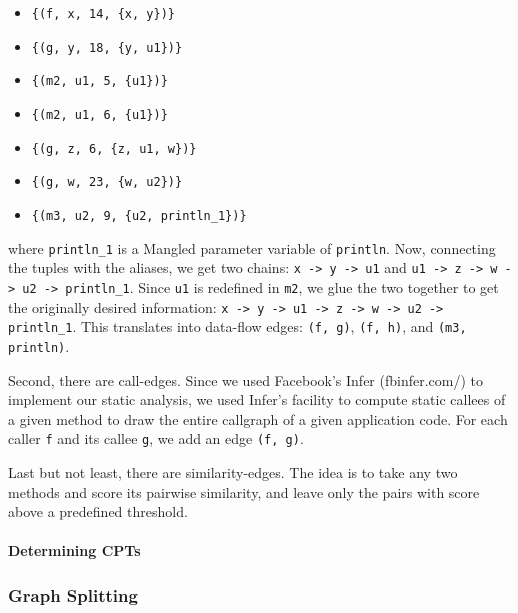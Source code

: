\documentclass[sigconf,review,anonymous]{acmart}\settopmatter{printfolios=true,printccs=false,printacmref=false}
\begin{document}
\begin{itemize}

\item \texttt{\{(f, x, 14, \{x, y\})\}}
\item \texttt{\{(g, y, 18, \{y, u1\})\}}
\item \texttt{\{(m2, u1, 5, \{u1\})\}}
\item \texttt{\{(m2, u1, 6, \{u1\})\}}
\item \texttt{\{(g, z, 6, \{z, u1, w\})\}}
\item \texttt{\{(g, w, 23, \{w, u2\})\}}
\item \texttt{\{(m3, u2, 9, \{u2, println_1\})\}}
    
\end{itemize}

where \texttt{println_1} is a Mangled parameter variable of \texttt{println}.
Now, connecting the tuples with the aliases, we get two chains: \texttt{x -> y
  -> u1} and \texttt{u1 -> z -> w -> u2 -> println_1}. Since \texttt{u1} is
redefined in \texttt{m2}, we glue the two together to get the originally desired
information: \texttt{x -> y -> u1 -> z -> w -> u2 -> println_1}. This translates
into data-flow edges: \texttt{(f, g)}, \texttt{(f, h)}, and \texttt{(m3, println)}.



Second, there are call-edges. Since we used Facebook's Infer (fbinfer.com/) to
implement our static analysis, we used Infer's facility to compute static
callees of a given method to draw the entire callgraph of a given application
code. For each caller \texttt{f} and its callee \texttt{g}, we add an edge
\texttt{(f, g)}.


Last but not least, there are similarity-edges. The idea is to take any two
methods and score its pairwise similarity, and leave only the pairs with score
above a predefined threshold.

\paragraph{Determining CPTs}



\subsubsection{Graph Splitting}
\end{document}
